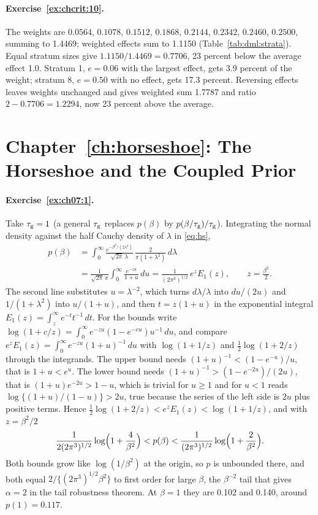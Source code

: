 \paragraph{Exercise~\ref{ex:chcrit:10}.} The weights are $0.0564$, $0.1078$, $0.1512$, $0.1868$, $0.2144$, $0.2342$, $0.2460$, $0.2500$, summing to 1.4469; weighted effects sum to 1.1150 (Table~\ref{tab:dml:strata}). Equal stratum sizes give $1.1150/1.4469=0.7706$, 23 percent below the average effect 1.0. Stratum 1, $e=0.06$ with the largest effect, gets 3.9 percent of the weight; stratum 8, $e=0.50$ with no effect, gets 17.3 percent. Reversing effects leaves weights unchanged and gives weighted sum 1.7787 and ratio $2-0.7706=1.2294$, now 23 percent above the average.

\section*{Chapter~\ref{ch:horseshoe}: The Horseshoe and the Coupled Prior}

\paragraph{Exercise~\ref{ex:ch07:1}.} Take $\tau_{\mathrm{g}} = 1$ (a general $\tau_{\mathrm{g}}$ replaces $p(\beta)$ by $p(\beta/\tau_{\mathrm{g}})/\tau_{\mathrm{g}}$). Integrating the normal density against the half Cauchy density of $\lambda$ in \eqref{eq:hs},
\begin{align*}
p(\beta) &= \int_0^\infty \frac{e^{-\beta^2/(2\lambda^2)}}{\sqrt{2\pi}\,\lambda}\,\frac{2}{\pi(1+\lambda^2)}\,d\lambda \\
&= \frac{1}{\sqrt{2\pi}\,\pi}\int_0^\infty \frac{e^{-zu}}{1+u}\,du = \frac{1}{(2\pi^3)^{1/2}}\,e^{z}E_1(z), \qquad z = \frac{\beta^2}{2}.
\end{align*}
The second line substitutes $u = \lambda^{-2}$, which turns $d\lambda/\lambda$ into $du/(2u)$ and $1/(1+\lambda^2)$ into $u/(1+u)$, and then $t = z(1+u)$ in the exponential integral $E_1(z) = \int_z^\infty e^{-t}t^{-1}\,dt$. For the bounds write $\log(1 + c/z) = \int_0^\infty e^{-zu}(1 - e^{-cu})u^{-1}\,du$, and compare $e^zE_1(z) = \int_0^\infty e^{-zu}(1+u)^{-1}\,du$ with $\log(1+1/z)$ and $\tfrac12\log(1+2/z)$ through the integrands. The upper bound needs $(1+u)^{-1} < (1 - e^{-u})/u$, that is $1 + u < e^u$. The lower bound needs $(1+u)^{-1} > (1 - e^{-2u})/(2u)$, that is $(1+u)e^{-2u} > 1 - u$, which is trivial for $u \geq 1$ and for $u < 1$ reads $\log\{(1+u)/(1-u)\} > 2u$, true because the series of the left side is $2u$ plus positive terms. Hence $\tfrac12\log(1+2/z) < e^zE_1(z) < \log(1+1/z)$, and with $z = \beta^2/2$
\[
\frac{1}{2(2\pi^3)^{1/2}}\log\Bigl(1 + \frac{4}{\beta^2}\Bigr) < p(\beta) < \frac{1}{(2\pi^3)^{1/2}}\log\Bigl(1 + \frac{2}{\beta^2}\Bigr).
\]
Both bounds grow like $\log(1/\beta^2)$ at the origin, so $p$ is unbounded there, and both equal $2/\{(2\pi^3)^{1/2}\beta^2\}$ to first order for large $\beta$, the $\beta^{-2}$ tail that gives $\alpha = 2$ in the tail robustness theorem. At $\beta = 1$ they are 0.102 and 0.140, around $p(1) = 0.117$.

